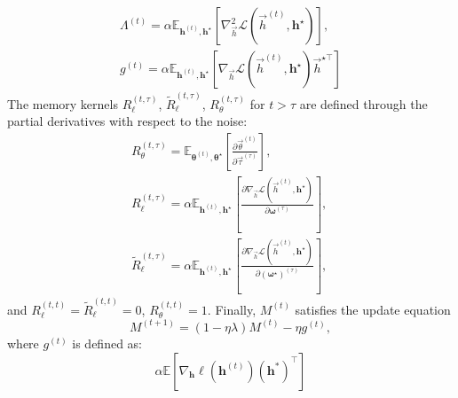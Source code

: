 \begin{theorem}
\begin{align}
    \Lambda^{(t)}  =  \alpha\mathbb{E}_{\boldsymbol{h}^{(t)}, \boldsymbol{h}^\star}\left[\nabla^2_{\vec h}\mathcal{L}\left( \vec h^{(t)}, \boldsymbol{h}^\star\right)\right] , \\ g^{(t)} = \alpha \mathbb{E}_{\boldsymbol{h}^{(t)}, \boldsymbol{h}^\star}\left[\nabla_{\vec h}\mathcal{L}\left( \vec h^{(t)}, \boldsymbol{h}^\star\right) \vec h^{\star\top}\right]
\end{align}
The memory kernels $R_\ell^{(t,\tau)}$, $\tilde R_\ell^{(t,\tau)}$, $R_\theta^{(t,\tau)}$ for $t > \tau$ are defined through the partial derivatives with respect to the noise:
\begin{eqnarray}
    &R_\theta^{(t,\tau)} = \mathbb{E}_{\boldsymbol{\theta}^{(t)}, \boldsymbol{\theta}^\star}\left[\frac{\partial  \vec \theta^{(t)}}{\partial  \vec \tau^{(\tau)}} \right] , \nonumber  \\
    &R_\ell^{(t,\tau)} = \alpha \mathbb{E}_{\boldsymbol{h}^{(t)}, \boldsymbol{h}^\star}\left[\frac{\partial  \nabla_{\vec h}\mathcal{L}\left( \vec h^{(t)}, \boldsymbol{h}^\star\right)}{\partial  \boldsymbol\omega^{(\tau)}} \right] ,\\
    &\tilde R_\ell^{(t,\tau)} = \alpha \mathbb{E}_{\boldsymbol{h}^{(t)}, \boldsymbol{h}^\star}\left[\frac{\partial  \nabla_{\vec h}\mathcal{L}\left( \vec h^{(t)}, \boldsymbol{h}^\star\right)}{\partial  \left(\boldsymbol\omega^\star\right)^{(\tau)}} \right] ,\quad
\end{eqnarray}
and $R_\ell^{(t,t)} = \tilde R_\ell^{(t,t)} = 0$, $R_\theta^{(t,t)}=1$.
Finally, $M^{(t)}$ satisfies the update equation    
\begin{equation} \label{2402:eq:def_M_rec}
    M^{(t+1)} =(1-\eta\lambda) M^{(t)} -\eta g^{(t)} ,
\end{equation}
where $g^{(t)}$ is defined as:
\begin{equation}\label{2402:eq:def_gt}
    \alpha \mathbb{E}\left[ \nabla_{\boldsymbol{h}} \ell(\boldsymbol{h}^{(t)}) \left( \boldsymbol{h}^* \right)^\top\right]
\end{equation}
\end{theorem}

